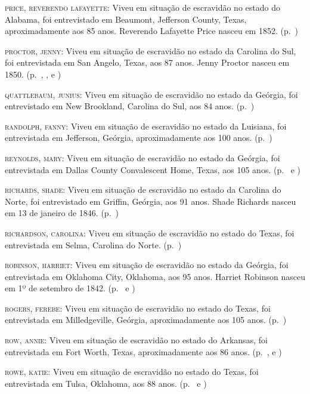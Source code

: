 \begin{Parskip}
\textsc{price, reverendo lafayette:} Viveu em situação de escravidão no estado do Alabama, foi
entrevistado em Beaumont, Jefferson County, Texas, aproximadamente aos
85 anos. Reverendo Lafayette Price nasceu em 1852. (p.~\pageref{ref215})

\textsc{proctor, jenny:} Viveu em situação de escravidão no estado da Carolina do Sul, foi
entrevistada em San Angelo, Texas, aos 87 anos. Jenny Proctor nasceu em
1850. (p.~\pageref{ref216}, \pageref{ref217}, \pageref{ref218} e \pageref{ref219})

\textsc{quattlebaum, junius:} Viveu em situação de escravidão no estado da Geórgia, foi
entrevistado em New Brookland, Carolina do Sul, aos 84 anos. (p.~\pageref{ref220})

\textsc{randolph, fanny:} Viveu em situação de escravidão no estado da Luisiana, foi entrevistada
em Jefferson, Geórgia, aproximadamente aos 100 anos. (p.~\pageref{ref221})

\textsc{reynolds, mary:} Viveu em situação de escravidão no estado da Geórgia, foi entrevistada
em Dallas County Convalescent Home, Texas, aos 105 anos. (p.~\pageref{ref222} e \pageref{ref223})

\textsc{richards, shade:} Viveu em situação de escravidão no estado da Carolina do Norte, foi
entrevistado em Griffin, Geórgia, aos 91 anos. Shade Richards nasceu em
13 de janeiro de 1846. (p.~\pageref{ref224})

\textsc{richardson, carolina:} Viveu em situação de escravidão no estado do Texas, foi
entrevistada em Selma, Carolina do Norte. (p.~\pageref{ref225})

\textsc{robinson, harriet:} Viveu em situação de escravidão no estado da Geórgia, foi
entrevistada em Oklahoma City, Oklahoma, aos 95 anos. Harriet Robinson
nasceu em 1º de setembro de 1842. (p.~\pageref{ref226} e \pageref{ref227})

\textsc{rogers, ferebe:} Viveu em situação de escravidão no estado do Texas, foi entrevistada em
Milledgeville, Geórgia, aproximadamente aos 105 anos. (p.~\pageref{ref228})

\textsc{row, annie:} Viveu em situação de escravidão no estado do Arkansas, foi entrevistada em
Fort Worth, Texas, aproximadamente aos 86 anos. (p.~\pageref{ref229}, \pageref{ref230} e \pageref{ref231})

\textsc{rowe, katie:} Viveu em situação de escravidão no estado do Texas, foi entrevistada em
Tulsa, Oklahoma, aos 88 anos. (p.~\pageref{ref232} e \pageref{ref233})


\end{Parskip}
